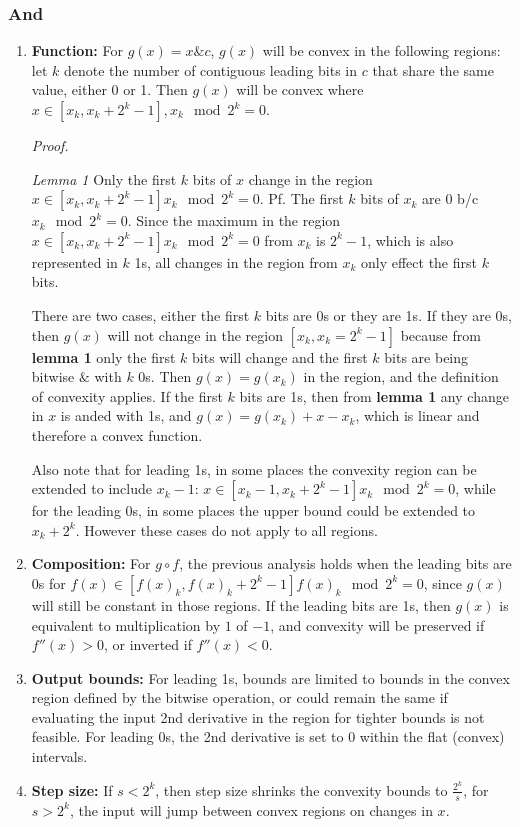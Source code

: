 \documentclass[11pt]{article}
\theoremstyle{definition}
\begin{document}
\subsubsection*{And}
\begin{enumerate}
\item \textbf{Function:} For $g(x) = x \& c$, $g(x)$ will be convex in the following regions: let $k$ denote the number of contiguous leading bits in $c$ that share the same value, either 0 or 1. Then $g(x)$ will be convex where $x \in [x_k, x_k + 2^k - 1], x_k \mod 2^k = 0$. 

{\it Proof.} 

{\it Lemma 1} Only the first $k$ bits of $x$ change in the region $x \in [x_k, x_k + 2^k - 1] x_k \mod 2^k = 0$. Pf. The first $k$ bits of $x_k$ are 0 b/c $x_k \mod 2^k = 0$. Since the maximum in the region $x \in [x_k, x_k + 2^k - 1] x_k \mod 2^k = 0$ from $x_k$ is $2^k-1$, which is also represented in $k$ 1s, all changes in the region from $x_k$ only effect the first $k$ bits.

There are two cases, either the first $k$ bits are 0s or they are 1s. If they are 0s, then $g(x)$ will not change in the region $[x_k, x_k = 2^k-1]$ because from \textbf{lemma 1} only the first $k$ bits will change and the first $k$ bits are being bitwise $\&$ with $k$ 0s. Then $g(x) = g(x_k)$ in the region, and the definition of convexity applies. If the first $k$ bits are 1s, then from \textbf{lemma 1} any change in $x$ is anded with 1s, and $g(x) = g(x_k) + x - x_k$, which is linear and therefore a convex function.

Also note that for leading 1s, in some places the convexity region can be extended to include $x_k-1$: $x \in [x_k - 1, x_k + 2^k - 1] x_k \mod 2^k = 0$, while for the leading 0s, in some places the upper bound could be extended to $x_k + 2^k$. However these cases do not apply to all regions.

\item \textbf{Composition:} For $g \circ f$, the previous analysis holds when the leading bits are 0s for $f(x) \in [f(x)_k, f(x)_k + 2^k - 1] f(x)_k \mod 2^k = 0$, since $g(x)$ will still be constant in those regions. If the leading bits are 1s, then $g(x)$ is equivalent to multiplication by $1$ of $-1$, and convexity will be preserved if $f''(x) > 0$, or inverted if $f''(x) < 0$.
\item \textbf{Output bounds:} For leading 1s, bounds are limited to bounds in the convex region defined by the bitwise operation, or could remain the same if evaluating the input 2nd derivative in the region for tighter bounds is not feasible. For leading 0s, the 2nd derivative is set to 0 within the flat (convex) intervals.
\item \textbf{Step size:} If $s < 2^k$, then step size shrinks the convexity bounds to $\frac{2^k}{s}$, for $s > 2^k$, the input will jump between convex regions on changes in $x$. 
\end{enumerate}
\end{document}
